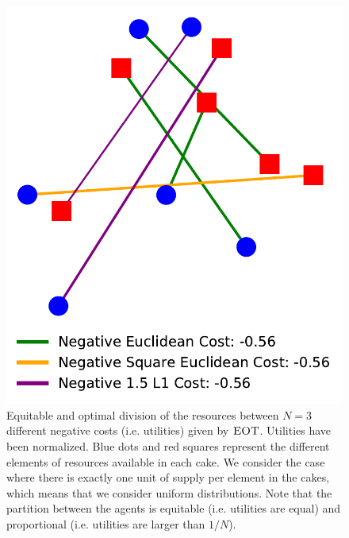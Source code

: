 
\begin{figure}[h!]
\centering
\includegraphics[width=0.3\linewidth]{figures/primal_W_1_2_3_neg_norm.pdf}
\caption{Equitable and optimal division of the resources between $N=3$ different negative costs (i.e. utilities) given by $\textsc{EOT}$. Utilities have been normalized. Blue dots and red squares represent the different elements of resources available in each cake. We consider the case where there is exactly one unit of supply per element in the cakes, which means that we consider uniform distributions. Note that the partition between the agents is equitable (i.e. utilities are equal) and proportional (i.e. utilities are larger than $1/N$).}
\label{fig:transport-map}
\end{figure}



